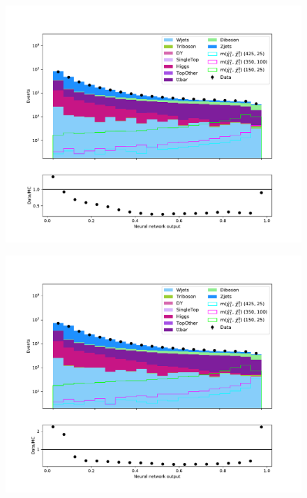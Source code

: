 \begin{figure}[H]
    \centering
        \includegraphics[width = \textwidth]{Figures/Stacked/stackedplot_NN_All_level_WW.pdf}
        \caption{}
        \label{fig:traintestscaled}
\end{figure}

\begin{figure}[H]
    \centering
        \includegraphics[width = \textwidth]{Figures/Stacked/stackedplot_NN_Low_level_WW.pdf}
        \caption{}
        \label{fig:traintestscaled}
\end{figure}

